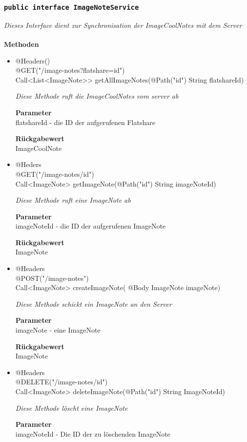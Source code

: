 	\subsubsection{\texttt{public interface ImageNoteService }}
\textit{Dieses Interface dient zur Synchronisation der ImageCoolNotes mit dem Server}\\
\\
	\textbf{Methoden} \\
		\begin{itemize}
		\item{@Headers()\\ @GET("/image-notes?flatshare={id}")\\
Call<List<ImageNote>> getAllImageNotes(@Path("id") String flatshareId)}

		\textit{Diese Methode ruft die ImageCoolNotes vom server ab}

		\textbf{Parameter} \\
	flatshareId - die ID der aufgerufenen Flatshare   

		\textbf{Rückgabewert} \\
	ImageCoolNote

      \item{@Heders\\ @GET("/image-notes/{id}")\\ Call<ImageNote> getImageNote(@Path("id") String imageNoteId)}

		\textit{Diese Methode ruft eine ImageNote ab }

		\textbf{Parameter} \\
		 imageNoteId - die ID der aufgerufenen ImageNote  

		\textbf{Rückgabewert} \\
	ImageNote

	\item{@Headers\\ @POST("/image-notes")\\ Call<ImageNote> createImageNote( @Body ImageNote imageNote)}

		\textit{Diese Methode schickt ein ImageNote an den Server}

		\textbf{Parameter} \\
		 imageNote - eine ImageNote  

		\textbf{Rückgabewert} \\
	ImageNote

	     \item{@Headers\\ @DELETE("/image-notes/{id}")\\Call<ImageNote> deleteImageNote(@Path("id") String ImageNoteId)}

		\textit{Diese Methode löscht eine ImageNote}

		\textbf{Parameter} \\
		 imageNoteId - Die ID der zu löschenden ImageNote  

	 \end{itemize}


